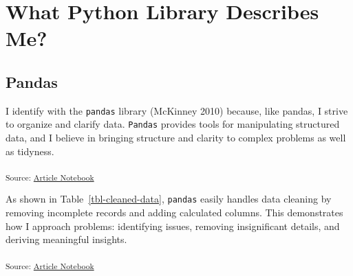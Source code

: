 \documentclass[
  letterpaper,
  DIV=11,
  numbers=noendperiod]{scrartcl}
\begin{document}
\section{What Python Library Describes
Me?}\label{what-python-library-describes-me}

\subsection{Pandas}\label{pandas}

I identify with the \texttt{pandas} library (McKinney 2010) because,
like pandas, I strive to organize and clarify data. \texttt{Pandas}
provides tools for manipulating structured data, and I believe in
bringing structure and clarity to complex problems as well as tidyness.

\textsubscript{Source:
\href{https://BenJPanackal.github.io/me-as-package/index.qmd.html}{Article
Notebook}}

\begin{table}

\caption{\label{tbl-cleaned-data}Student data before and after cleaning
with pandas}


\end{table}%

As shown in Table~\ref{tbl-cleaned-data}, \texttt{pandas} easily handles
data cleaning by removing incomplete records and adding calculated
columns. This demonstrates how I approach problems: identifying issues,
removing insignificant details, and deriving meaningful insights.

\textsubscript{Source:
\href{https://BenJPanackal.github.io/me-as-package/index.qmd.html}{Article
Notebook}}
\end{document}
